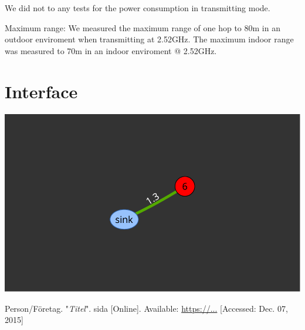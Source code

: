\documentclass[a4paper,11pt]{article}
\begin{document}
We did not to any tests for the power consumption in transmitting
mode.

Maximum range:
We measured the maximum range of one hop to 80m in an outdoor 
enviroment when transmitting at 2.52GHz. 
The maximum indoor range was measured to 70m in an indoor
enviroment @ 2.52GHz.
 

\section{Interface}
\begin{center}
\includegraphics[width=.5\textwidth]{map}
\end{center}

\cite{label}

\begin{thebibliography}{2}

  Person/Företag. "\emph{Titel}". sida [Online]. Available: \url{https://...} [Accessed: Dec. 07, 2015]

\end{thebibliography}
\end{document}
